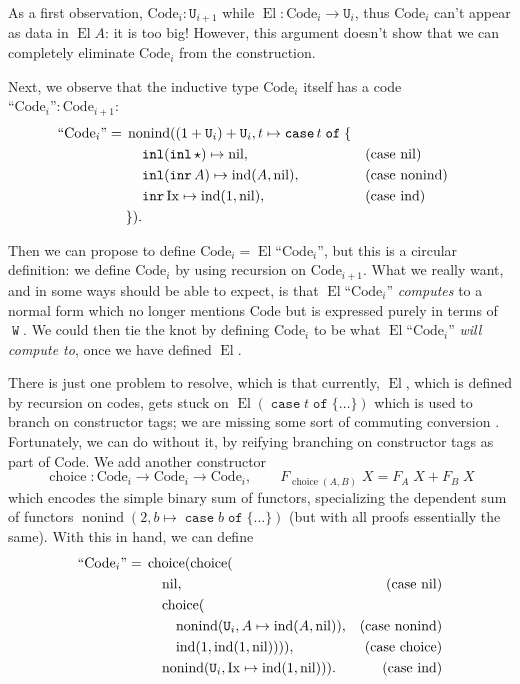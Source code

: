 \documentclass[a4paper,UKenglish,cleveref,nameinlink,autoref,thm-restate]{lipics-v2019}
\newcommand{\U}{\mathtt{U}}
\DeclareMathOperator{\case}{\mathtt{case}}
\newcommand{\caset}[2]{\case {#1}\;\mathtt{of}\;\{{#2}\}}
\DeclareMathOperator{\W}{\mathtt{W}}
\DeclareMathOperator{\inl}{\mathtt{inl}}
\DeclareMathOperator{\inr}{\mathtt{inr}}
\DeclareMathOperator{\nonind}{nonind}
\DeclareMathOperator{\ind}{ind}
\DeclareMathOperator{\nil}{nil}
\DeclareMathOperator{\choice}{choice}
\newcommand{\Code}{\mathrm{Code}}
\newcommand{\Ix}{\mathrm{Ix}}
\DeclareMathOperator{\El}{El}
\newcommand{\mathquote}[1]{\text{``${#1}$''}}
\begin{document}
As a first observation, $\Code_i : \U_{i+1}$ while $\El : \Code_i \to \U_i$, thus $\Code_i$ can't appear as data in $\El A$: it is too big! However, this argument doesn't show that we can completely eliminate $\Code_i$ from the construction.

Next, we observe that the inductive type $\Code_i$ itself has a code $\mathquote{\Code_i} : \Code_{i+1}$:
\begin{align*}
\mathquote{\Code_i} ={}& \nonind((1+\U_i)+\U_i,t \mapsto \case t\;\mathtt{of}\;\{\\
&\quad \inl(\inl\star) \mapsto \nil,&&\text{(case $\nil$)} \notag\\
&\quad \inl(\inr A) \mapsto \ind(A,\nil),&&\text{(case $\nonind$)} \notag\\
&\quad \inr \Ix \mapsto \ind(1,\nil),&&\text{(case $\ind$)} \notag\\
&\notag\}).
\end{align*}

Then we can propose to define $\Code_i = \El \mathquote{\Code_i}$, but this is a circular definition: we define $\Code_i$ by using recursion on $\Code_{i+1}$. What we really want, and in some ways should be able to expect, is that $\El\mathquote{\Code_i}$ \emph{computes} to a normal form which no longer mentions $\Code$ but is expressed purely in terms of $\W$. We could then tie the knot by defining $\Code_i$ to be what $\El \mathquote{\Code_i}$ \emph{will compute to}, once we have defined $\El$.

There is just one problem to resolve, which is that currently, $\El$, which is defined by recursion on codes, gets stuck on $\El (\caset{t}{\dots})$ which is used to branch on constructor tags;
we are missing some sort of commuting conversion \cite[section 10]{girard-proofs-and-types}.
Fortunately, we can do without it, by reifying branching on constructor tags as part of $\Code$. We add another constructor
\begin{equation}
\choice : \Code_i \to \Code_i \to \Code_i,\qquad F_{\choice(A,B)}\;X = F_A\;X + F_B\;X
\end{equation}
which encodes the simple binary sum of functors, specializing the dependent sum of functors $\nonind(2,b\mapsto\caset{b}{\dots})$ (but with all proofs essentially the same). With this in hand, we can define
\begin{align}
\mathquote{\Code_i} ={}& \choice(\choice(\\
&\quad\nil,&\text{(case $\nil$)}\notag\\
&\quad\choice(\notag\\
&\qquad\nonind(\U_i,A\mapsto \ind(A,\nil)),&\text{(case $\nonind$)}\notag\\
&\qquad\ind(1,\ind(1,\nil)))),&\text{(case $\choice$)}\notag\\
&\quad\nonind(\U_i,\Ix \mapsto \ind(1,\nil))).&\text{(case $\ind$)}\notag
\end{align}
\end{document}
